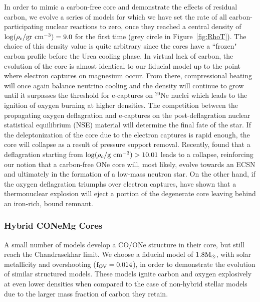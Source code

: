 \documentclass[../../main/thesis_msc.tex]{subfiles}
\begin{document}
        In order to mimic a carbon-free core and demonstrate the effects of residual carbon, we evolve a series of models for which we have set the rate of all carbon-participating nuclear reactions to zero, once they reached a central density of $\rm \log(\rho_c / \rm gr \ cm^{-3}) = 9.0$ for the first time (grey circle in Figure\, \ref{fig:RhoT}). The choice of this density value is quite arbitrary since the cores have a ``frozen" carbon profile before the Urca cooling phase. In virtual lack of carbon, the evolution of the core is almost identical to our fiducial model up to the point where electron captures on magnesium occur. From there, compressional heating will once again balance neutrino cooling and the density will continue to grow until it surpasses the threshold for e-captures on $^{20}$Ne nuclei which leads to the ignition of oxygen burning at higher densities. The competition between the propagating oxygen deflagration and e-captures on the post-deflagration nuclear statistical equilibrium (NSE) material will determine the final fate of the star. If the deleptonization of the core due to the electron captures is rapid enough, the core will collapse as a result of pressure support removal. Recently, \cite{Zha2019} found that a deflagration starting from $\log(\rho_c / \rm g \ cm^{-3}) > 10.01$ leads to a collapse, reinforcing our notion that a carbon-free ONe core will, most likely, evolve towards an ECSN and ultimately in the formation of a low-mass neutron star. On the other hand, if the oxygen deflagration triumphs over electron captures, \cite{Jones2016} have shown that a thermonuclear explosion will eject a portion of the degenerate core leaving behind an iron-rich, bound remnant.
        
        
        \subsubsection{Hybrid CONeMg Cores}
    
        A small number of models develop a CO/ONe structure in their core, but still reach the Chandrasekhar limit. We choose a fiducial model of $1.8 \rm M_{\odot}$, with solar metallicity and overshooting ($\rm f_{\rm OV} = 0.014$), in order to demonstrate the evolution of similar structured models. 
        These models ignite carbon and oxygen explosively at even lower densities when compared to the case of non-hybrid stellar models due to the larger mass fraction of carbon they retain.
        
\end{document}
